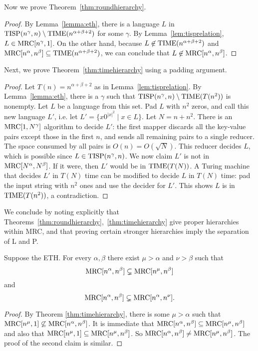 Now we prove Theorem~\ref{thm:roundhierarchy}.

\begin{proof}
By Lemma~\ref{lemma:eth}, there is a language $L$ in $\textup{TISP}(n^\gamma,
n)\setminus \textup{TIME}(n^{\alpha+\beta+2})$ for some $\gamma$. By
Lemma~\ref{lem:tisprelation}, $L\in \textup{MRC}[n^\gamma, 1]$. On the other hand,
because $L\not\in  \textup{TIME}(n^{\alpha+\beta+2})$ and $\textup{MRC}[n^\alpha, n^\beta]\subseteq
\textup{TIME}(n^{\alpha+\beta+2})$, we can conclude that $L\not\in
\textup{MRC}[n^\alpha, n^\beta]$.
\end{proof}

Next, we prove Theorem~\ref{thm:timehierarchy} using a padding argument.

\begin{proof}
Let $T(n) = n^{\alpha + \beta + 2}$ as in Lemma~\ref{lem:tisprelation}. By
Lemma~\ref{lemma:eth}, there is a $\gamma$ such that $\textup{TISP}(n^\gamma,
n)\setminus\textup{TIME}(T(n^{2}))$ is nonempty.  Let $L$ be a language from this set.
Pad $L$ with $n^{2}$ zeros, and call this new language $L'$, i.e. let $L' = \{x
0^{|x|^{2}} \mid x \in  L\}$. Let $N = n + n^{2}$. There is an $\textup{MRC}[1,
N^\gamma]$ algorithm to decide $L'$: the first mapper discards all the
key-value pairs except those in the first $n$, and sends all remaining pairs to
a single reducer. The space consumed by all pairs is $O(n) = O(\sqrt{N})$. This
reducer decides $L$, which is possible since $L \in \textup{TISP}(n^\gamma, n)$. We now
claim $L'$ is not in $\textup{MRC}[N^\alpha, N^\beta]$. If it were, then $L'$ would be
in $\textup{TIME}(T(N))$. A Turing machine that decides $L'$ in $T(N)$ time can be
modified to decide $L$ in $T(N)$ time: pad the input string with $n^{2}$ ones
and use the decider for $L'$. This shows $L$ is in $\textup{TIME}(T(n^{2}))$, a
contradiction.  \end{proof}

We conclude by noting explicitly that
Theorems~\ref{thm:roundhierarchy},~\ref{thm:timehierarchy} give proper
hierarchies within MRC, and that proving certain stronger hierarchies imply the
separation of L and P.

\begin{corollary} \label{cor:mrchierarchy}
Suppose the ETH. For every $\alpha, \beta$ there exist $\mu>\alpha$ and $\nu>\beta$
such that $$\textup{MRC}[n^\alpha, n^\beta] \subsetneq \textup{MRC}[n^\mu, n^\beta]$$ and
$$\textup{MRC}[n^\alpha, n^\beta] \subsetneq \textup{MRC}[n^\alpha, n^\nu].$$
\end{corollary}

\begin{proof}
By Theorem \ref{thm:timehierarchy}, there is some $\mu > \alpha$ such that
$\textup{MRC}[n^\mu, 1] \not\subseteq \textup{MRC}[n^\alpha, n^\beta]$.  It is immediate that
$\textup{MRC}[n^\alpha, n^\beta] \subseteq \textup{MRC}[n^\mu, n^\beta]$ and also that
$\textup{MRC}[n^\mu,1]\subseteq\textup{MRC}[n^\mu,n^\beta]$.  So $\textup{MRC}[n^\alpha,n^\beta]\neq
\textup{MRC}[n^\mu, n^\beta]$.  The proof of the second claim is similar.
\end{proof}


